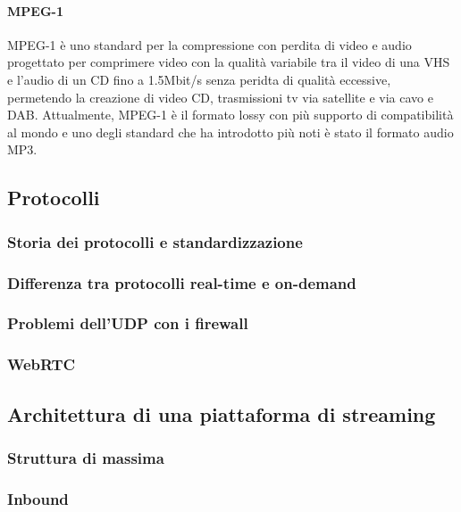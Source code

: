          \paragraph{MPEG-1}
         MPEG-1 è uno standard per la compressione con perdita di video e audio progettato per comprimere video con la qualità variabile tra il video di una \gls{VHS} e l'audio di un CD fino a 1.5Mbit/s senza peridta di qualità eccessive, permetendo la creazione di video CD, trasmissioni tv via satellite e via cavo e \gls{DAB}. Attualmente, MPEG-1 è il formato lossy con più supporto di compatibilità al mondo e uno degli standard che ha introdotto più noti è stato il formato audio MP3.



   \subsection{Protocolli}
      \subsubsection{Storia dei protocolli e standardizzazione}
         
      \subsubsection{Differenza tra protocolli real-time e on-demand}

      \subsubsection{Problemi dell'UDP con i firewall}

      \subsubsection{WebRTC}

   \subsection{Architettura di una piattaforma di streaming}
      \subsubsection{Struttura di massima}

      \subsubsection{Inbound}
